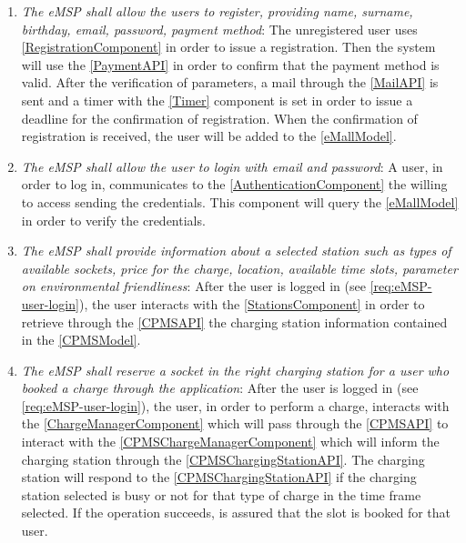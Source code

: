 \begin{enumerate}[label=\textbf{R\arabic*}]
    \item \textit{The \ac{eMSP} shall allow the users to register, providing name, surname, birthday, email, password, payment method}: 
    The unregistered user uses \ref{RegistrationComponent} in order to issue a registration. 
    Then the system will use the \ref{PaymentAPI} in order to confirm that the payment method is valid. 
    After the verification of parameters, a mail through the \ref{MailAPI} is sent and a timer with the \ref{Timer} component is set in order to issue a deadline for the confirmation of registration. 
    When the confirmation of registration is received, the user will be added to the \ref{eMallModel}.
    \label{req:eMSP-user-registration}
    \item \textit{The \ac{eMSP} shall allow the user to login with email and password}:
    A user, in order to log in, communicates to the \ref{AuthenticationComponent} the willing to access sending the credentials. This component will query the \ref{eMallModel} in order to verify the credentials.
    \label{req:eMSP-user-login}
    \item \textit{The \ac{eMSP} shall provide information about a selected station such as types of available sockets, price for the charge, location, available time slots, parameter on environmental friendliness}:
    After the user is logged in (see \ref{req:eMSP-user-login}), the user interacts with the \ref{StationsComponent} in order to retrieve through the \ref{CPMSAPI} the charging station information contained in the \ref{CPMSModel}.
    \label{req:eMSP-info-station}
    \item \textit{The \ac{eMSP} shall reserve a socket in the right charging station for a user who booked a charge through the application}:
    After the user is logged in (see \ref{req:eMSP-user-login}), the user, in order to perform a charge, interacts with the \ref{ChargeManagerComponent} which will pass through the \ref{CPMSAPI} to interact with the \ref{CPMSChargeManagerComponent} which will inform the charging station through the \ref{CPMSChargingStationAPI}. 
    The charging station will respond to the \ref{CPMSChargingStationAPI} if the charging station selected is busy or not for that type of charge in the time frame selected. If the operation succeeds, is assured that the slot is booked for that user.

\end{enumerate}
